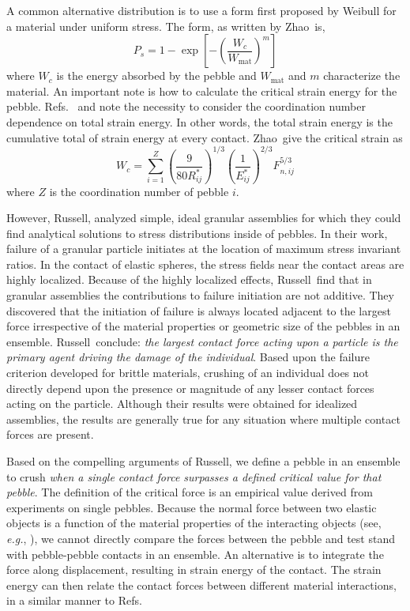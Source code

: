 A common alternative distribution is to use a form first proposed by Weibull for a material under uniform stress\cite{Kwok2013,Zhao2011,nakata1999probabilistic,Zhao2013,Pitchumani2004}. The form, as written by Zhao\etal~is,
\begin{equation}
	P_s = 1 - \exp\left[-\left(\frac{W_c}{W_\text{mat}}\right)^m\right]
\end{equation}
where $W_c$ is the energy absorbed by the pebble and $W_\text{mat}$ and $m$ characterize the material. An important note is how to calculate the critical strain energy for the pebble. Refs.~\cite{Marketos2007} and \cite{Zhao2011} note the necessity to consider the coordination number dependence on total strain energy. In other words, the total strain energy is the cumulative total of strain energy at every contact. Zhao\etal~give the critical strain as
\begin{equation}
	W_c = \sum_{i=1}^{Z}\left(\frac{9}{80 R_{ij}^*}\right)^{1/3} \left(\frac{1}{E_{ij}^*}\right)^{2/3} F_{n,ij}^{5/3}
\end{equation}
where $Z$ is the coordination number of pebble $i$. 

However, Russell\etal, analyzed simple, ideal granular assemblies for which they could find analytical solutions to stress distributions inside of pebbles.\cite{Russell2009} In their work, failure of a granular particle initiates at the location of maximum stress invariant ratios. In the contact of elastic spheres, the stress fields near the contact areas are highly localized. Because of the highly localized effects, Russell\etal~find that in granular assemblies the contributions to failure initiation are not additive. They discovered that the initiation of failure is always located adjacent to the largest force irrespective of the material properties or geometric size of the pebbles in an ensemble. Russell\etal~conclude: \emph{the largest contact force acting upon a particle is the primary agent driving the damage of the individual}.\cite{Russell2009} Based upon the failure criterion developed for brittle materials, crushing of an individual does not directly depend upon the presence or magnitude of any lesser contact forces acting on the particle. Although their results were obtained for idealized assemblies, the results are generally true for any situation where multiple contact forces are present.




Based on the compelling arguments of Russell\etal, we define a pebble in an ensemble to crush \emph{when a single contact force surpasses a defined critical value for that pebble}. The definition of the critical force is an empirical value derived from experiments on single pebbles. Because the normal force between two elastic objects is a function of the material properties of the interacting objects (see, \textit{e.g.}, ), we cannot directly compare the forces between the pebble and test stand with pebble-pebble contacts in an ensemble. An alternative is to integrate the force along displacement, resulting in strain energy of the contact. The strain energy can then relate the contact forces between different material interactions, in a similar manner to Refs\cite{Zhao2013,Annabattula2012a}.

